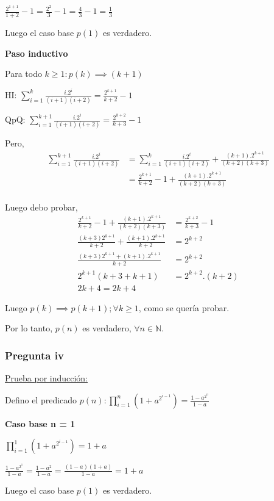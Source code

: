 $\frac{2^{1+1}}{1+2}-1 = \frac{2^2}{3} -1 = \frac{4}{3} - 1 = \frac{1}{3} $

Luego el caso base $p(1)$ es verdadero.

\textbf{Paso inductivo}

Para todo $k \geq 1: p(k) \implies (k+1)$

HI: $\sum_{i=1}^{k}\frac{i.2^i}{(i+1)(i+2)} = \frac{2^{k+1}}{k+2}-1$

QpQ: $\sum_{i=1}^{k+1}\frac{i.2^i}{(i+1)(i+2)} = \frac{2^{k+2}}{k+3}-1$

Pero,
\begin{align*}
    \sum_{i=1}^{k+1}\frac{i.2^i}{(i+1)(i+2)} &= \sum_{i=1}^{k}\frac{i.2^i}{(i+1)(i+2)} + \frac{(k+1).2^{k+1}}{(k+2)(k+3)} \\
    &= \frac{2^{k+1}}{k+2}-1 + \frac{(k+1).2^{k+1}}{(k+2)(k+3)} \\
\end{align*}

Luego debo probar,
\begin{align*}
    \frac{2^{k+1}}{k+2}-1 + \frac{(k+1).2^{k+1}}{(k+2)(k+3)} &= \frac{2^{k+2}}{k+3}-1 \\
    \frac{(k+3)2^{k+1}}{k+2} + \frac{(k+1).2^{k+1}}{k+2} &= 2^{k+2} \\
    \frac{(k+3)2^{k+1} + (k+1).2^{k+1}}{k+2} &= 2^{k+2} \\
    2^{k+1} \left( k+3 + k+1 \right) &= 2^{k+2} . (k+2) \\
    2k+4 = 2k+4
\end{align*}

Luego $p(k) \implies p(k+1); \forall k \geq 1$, como se quería probar.

Por lo tanto, $p(n)$ es verdadero, $\forall n \in \mathbb{N}$.

\subsubsection{Pregunta iv}

\underline{Prueba por inducción:}

Defino el predicado $p(n) : \prod_{i=1}^{n}\left(1+a^{2^{i-1}}\right)= \frac{1-a^{2^n}}{1-a}$

\textbf{Caso base n = 1}

$\prod_{i=1}^{1}\left(1+a^{2^{i-1}}\right) = 1+a$

$\frac{1-a^{2^1}}{1-a} = \frac{1-a^2}{1-a} = \frac{(1-a)(1+a)}{1-a} = 1+a$

Luego el caso base $p(1)$ es verdadero.


